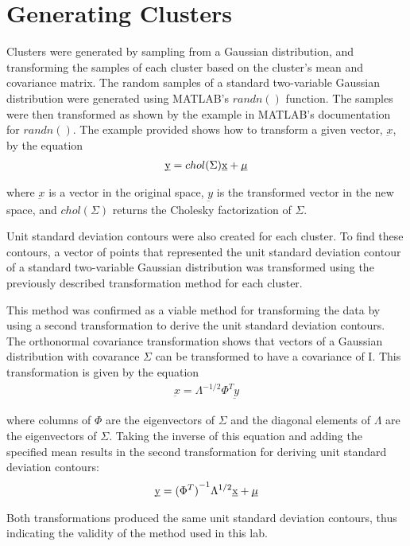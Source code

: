 \section{Generating Clusters}
Clusters were generated by sampling from a Gaussian distribution, and transforming the samples of each cluster based on the cluster's mean and covariance matrix. The random samples of a standard two-variable Gaussian distribution were generated using MATLAB's $randn()$ function. The samples were then transformed as shown by the example in MATLAB's documentation for $randn()$. The example provided shows how to transform a given vector, $\underbar{x}$, by the equation
\begin{eqnarray}
\label{eqn:chol_transform}
\underbar {y} = chol(\Sigma) \underbar {x} + \underbar {$\mu$}
\end{eqnarray}

where $\underbar{x}$ is a vector in the original space, $\underbar{y}$ is the transformed vector in the new space, and $chol(\Sigma)$ returns the Cholesky factorization of $\Sigma$.

Unit standard deviation contours were also created for each cluster. To find these contours, a vector of points that represented the unit standard deviation contour of a standard two-variable Gaussian distribution was transformed using the previously described transformation method for each cluster.

This method was confirmed as a viable method for transforming the data by using a second transformation to derive the unit standard deviation contours. The orthonormal covariance transformation shows that vectors of a Gaussian distribution with covarance $\Sigma$ can be transformed to have a covariance of I. This transformation is given by the equation
\begin{eqnarray}
\label{eqn:ortho_transform}
\underbar{x} = {\Lambda}^{-1/2} \Phi^T \underbar{y}
\end{eqnarray}

where columns of $\Phi$ are the eigenvectors of $\Sigma$ and the diagonal elements of $\Lambda$ are the eigenvectors of $\Sigma$. Taking the inverse of this equation and adding the specified mean results in the second transformation for deriving unit standard deviation contours:
\begin{eqnarray}
\label{eqn:ortho_inv_transform}
\underbar{y} = {(\Phi^{T})}^{-1} \Lambda^{1/2}\underbar{x}+\underbar{$\mu$}
\end{eqnarray}

Both transformations produced the same unit standard deviation contours, thus indicating the validity of the method used in this lab.

